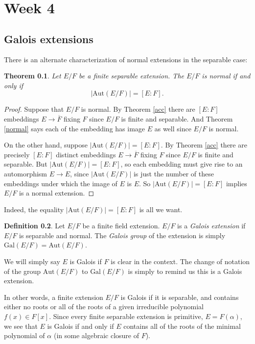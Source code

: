 \documentclass[12pt]{report}
\newtheorem{thm}{Theorem}[section]
\theoremstyle{definition}
\newtheorem{defn}[thm]{Definition}
\def\Aut{\text{Aut}}
\def\aa{\alpha}
\def\Gal{\text{Gal}}
\begin{document}
\chapter*{Week 4}
\setcounter{chapter}{4}

\section{Galois extensions}

There is an alternate characterization of normal extensions in the separable case:

\begin{thm}\label{num1}
    Let $E/F$ be a finite separable extension. The $E/F$ is normal if and only if $$|\Aut(E/F)|=[E:F].$$
\end{thm}

\begin{proof}
    Suppose that $E/F$ is normal. By Theorem \ref{acc} there are $[E:F]$ embeddings $E\to \overline{F}$ fixing $F$ since $E/F$ is finite and separable. And Theorem \ref{normal} says each of the embedding has image $E$ as well since $E/F$ is normal.
    
    On the other hand, suppose $|\Aut(E/F)| = [E:F]$. By Theorem \ref{acc} there are precisely $[E:F]$ distinct embeddings $E\to \overline{F}$ fixing $F$ since $E/F$ is finite and separable. But $|\Aut(E/F)| = [E:F]$, so each embedding must give rise to an automorphism $E\to E$, since $|\Aut(E/F)|$ is just the number of these embeddings under which the image of $E$ is $E$. So $|\Aut(E/F)| = [E:F]$ implies $E/F$ is a normal extension.
\end{proof}

Indeed, the equality $|\Aut(E/F)|=[E:F]$ is all we want.

\begin{defn}
    Let $E/F$ be a finite field extension. $E/F$ is a \emph{Galois extension} if $E/F$ is separable and normal. The \emph{Galois group} of the extension is simply $\Gal(E/F)=\Aut(E/F)$.
\end{defn}

We will simply say $E$ is Galois if $F$ is clear in the context. The change of notation of the group $\Aut(E/F)$ to $\Gal(E/F)$ is simply to remind us this is a Galois extension.

In other words, a finite extension $E/F$ is Galois if it is separable, and contains either no roots or all of the roots of a given irreducible polynomial $f(x)\in F[x]$. Since every finite separable extension is primitive, $E = F(\aa)$, we see that $E$ is Galois if and only if $E$ contains all of the roots of the minimal polynomial of $\aa$ (in some algebraic closure of $F$).
\end{document}
